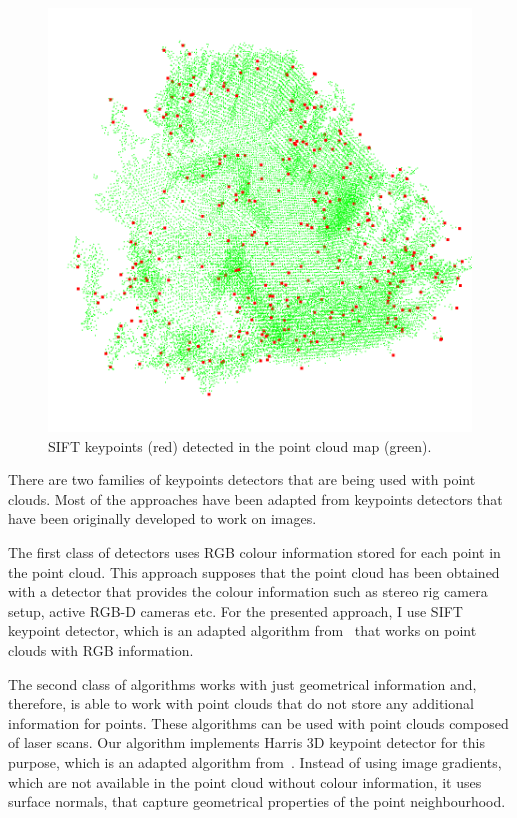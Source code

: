 \begin{figure}
    \centering
    \includegraphics[width=\textwidth]{../img/v1-keypoints.png}
    \caption[Detected keypoints]{\gls{SIFT} keypoints (red) detected in the point cloud map (green).}
    \label{fig:v1-keypoints}
\end{figure}

There are two families of keypoints detectors that are being used with point clouds. Most of the approaches have been adapted from keypoints detectors that have been originally developed to work on images.

The first class of detectors uses \gls{RGB} colour information stored for each point in the point cloud. This approach supposes that the point cloud has been obtained with a detector that provides the colour information such as stereo rig camera setup, active \gls{RGB-D} cameras etc. For the presented approach, I use \gls{SIFT} keypoint detector, which is an adapted algorithm from~\citet{lowe2004distinctive} that works on point clouds with \gls{RGB} information.

The second class of algorithms works with just geometrical information and, therefore, is able to work with point clouds that do not store any additional information for points. These algorithms can be used with point clouds composed of laser scans. Our algorithm implements Harris \gls{3D} keypoint detector for this purpose, which is an adapted algorithm from~\citet{harris1988combined}. Instead of using image gradients, which are not available in the point cloud without colour information, it uses surface normals, that capture geometrical properties of the point neighbourhood.

